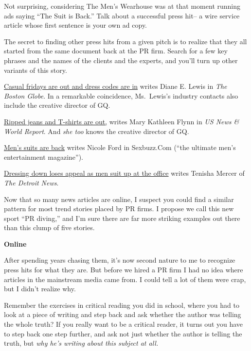 Not surprising, considering The Men's Wearhouse was at that moment
running ads saying ``The Suit is Back.'' Talk about a successful press
hit-- a wire service article whose first sentence is your own ad copy.

The secret to finding other press hits from a given pitch is to realize
that they all started from the same document back at the PR firm. Search
for a few key phrases and the names of the clients and the experts, and
you'll turn up other variants of this story.

\href{http://bostonworks.boston.com/globe/articles/091904_suit.html}{Casual
fridays are out and dress codes are in} writes Diane E. Lewis in
\emph{The Boston Globe}. In a remarkable coincidence, Ms.~Lewis's
industry contacts also include the creative director of GQ.

\href{http://www.usnews.com/usnews/biztech/articles/041108/8eedress.htm}{Ripped
jeans and T-shirts are out,} writes Mary Kathleen Flynn in \emph{US News
\& World Report}. And \emph{she too} knows the creative director of GQ.

\href{http://www.sexbuzz.com/style/9,0004,00.shtml}{Men's suits are
back} writes Nicole Ford in Sexbuzz.Com (``the ultimate men's
entertainment magazine'').

\href{http://www.detnews.com/2004/careers/0405/28/b01-149207.htm}{Dressing
down loses appeal as men suit up at the office} writes Tenisha Mercer of
\emph{The Detroit News}.

Now that so many news articles are online, I suspect you could find a
similar pattern for most trend stories placed by PR firms. I propose we
call this new sport ``PR diving,'' and I'm sure there are far more
striking examples out there than this clump of five stories.

\textbf{Online}

After spending years chasing them, it's now second nature to me to
recognize press hits for what they are. But before we hired a PR firm I
had no idea where articles in the mainstream media came from. I could
tell a lot of them were crap, but I didn't realize why.

Remember the exercises in critical reading you did in school, where you
had to look at a piece of writing and step back and ask whether the
author was telling the whole truth? If you really want to be a critical
reader, it turns out you have to step back one step further, and ask not
just whether the author is telling the truth, but \emph{why he's writing
about this subject at all.}

